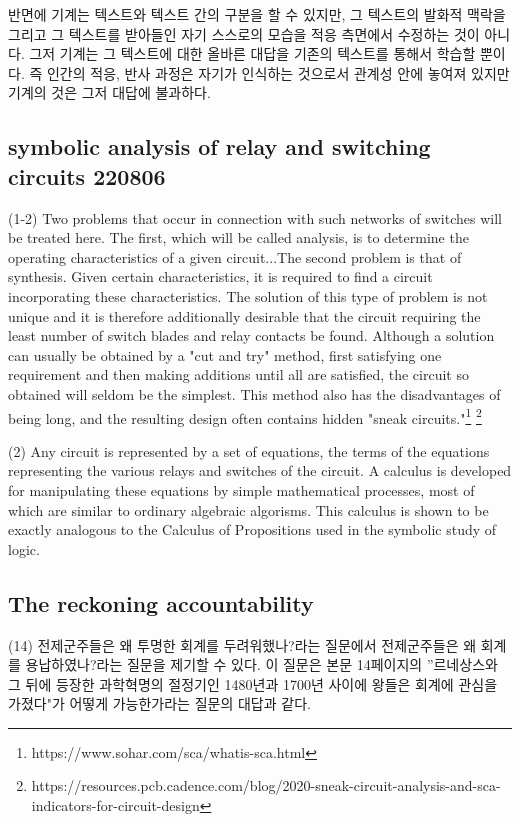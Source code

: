 \documentclass[12pt, a4paper]{article}
\begin{document}
반면에 기계는 텍스트와 텍스트 간의 구분을 할 수 있지만, 그 텍스트의 발화적 맥락을 그리고 그 텍스트를 받아들인 자기 스스로의 모습을 적응 측면에서 수정하는 것이 아니다. 그저 기계는 그 텍스트에 대한 올바른 대답을 기존의 텍스트를 통해서 학습할 뿐이다. 즉 인간의 적응, 반사 과정은 자기가 인식하는 것으로서 관계성 안에 놓여져 있지만 기계의 것은 그저 대답에 불과하다. 

\newpage
\subsection{symbolic analysis of relay and switching circuits 220806}

(1-2) Two problems that occur in connection with such networks of switches will be treated here. The first, which will be called
analysis, is to determine the operating characteristics
of a given circuit...The second problem is that of synthesis. Given certain characteristics, it is required to find a circuit incorporating these characteristics. The solution of this type of problem is not unique and it is therefore additionally desirable that the circuit requiring the least number of switch blades and relay contacts be found. Although a solution can usually be
obtained by a "cut and try" method, first satisfying
one requirement and then making additions until all
are satisfied, the circuit so obtained will seldom
be the simplest. This method also has the disadvantages
of being long, and the resulting design often
contains hidden "sneak circuits."\footnote{https://www.sohar.com/sca/whatis-sca.html} \footnote{https://resources.pcb.cadence.com/blog/2020-sneak-circuit-analysis-and-sca-indicators-for-circuit-design}

(2) Any circuit is represented by a set of equations,
the terms of the equations representing the
various relays and switches of the circuit. A calculus
is developed for manipulating these equations
by simple mathematical processes, most of which are
similar to ordinary algebraic algorisms. This calculus
is shown to be exactly analogous to the Calculus
of Propositions used in the symbolic study of
logic. \\

\newpage

\subsection{The reckoning accountability}

(14) 전제군주들은 왜 투명한 회계를 두려워했나?라는 질문에서 전제군주들은 왜 회계를 용납하였나?라는 질문을 제기할 수 있다. 이 질문은 본문 14페이지의 ''르네상스와 그 뒤에 등장한 과학혁명의 절정기인 1480년과 1700년 사이에 왕들은 회계에 관심을 가졌다"가 어떻게 가능한가라는 질문의 대답과 같다. \\
\end{document}
